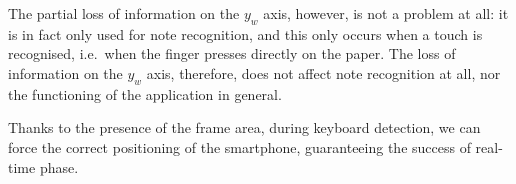 The partial loss of information on the $y_w$ axis, however, is not a problem at all: it is in fact only used for
note recognition, and this only occurs when a touch is recognised, i.e.\ when the finger presses directly on the paper.
The loss of information on the $y_w$ axis, therefore, does not affect note recognition at all,
nor the functioning of the application in general.

Thanks to the presence of the frame area, during keyboard detection,
we can force the correct positioning of the smartphone, guaranteeing the success of real-time phase.
